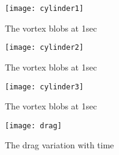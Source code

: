 \documentclass[12pt]{article}
\begin{document}
\begin{figure}
    \centering
    \texttt{[image: cylinder1]}
    \caption{The vortex blobs at 1sec} 
\end{figure}
\begin{figure}
    \centering
    \texttt{[image: cylinder2]}
    \caption{The vortex blobs at 1sec} 
\end{figure}
\begin{figure}
    \centering
    \texttt{[image: cylinder3]}
    \caption{The vortex blobs at 1sec} 
\end{figure}





\begin{figure}
    \centering
    \texttt{[image: drag]}
    \caption{The drag variation with time} 
\end{figure}
\end{document}
